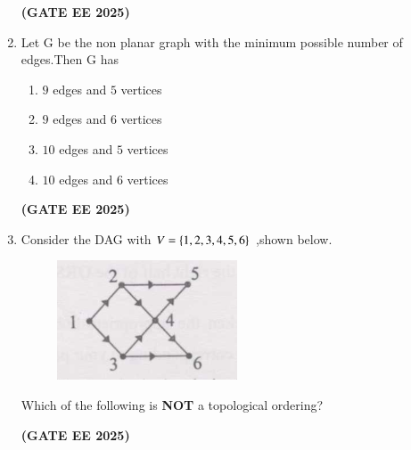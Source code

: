 \documentclass[journal,12pt,onecolumn]{IEEEtran}
\theoremstyle{remark}
\begin{document}
\begin{enumerate}
    \begin{enumerate}[label=(\Alph*)]
\end{enumerate}
\hfill \textbf{(GATE EE 2025)}


\item   Let G be the non planar graph with the minimum possible number of edges.Then G has

\begin{enumerate}

    \item $9$ edges and  $5$  vertices
    \item $9$ edges and  $6$  vertices
    \item $10$ edges and  $5$  vertices
    \item $10$ edges and  $6$  vertices

\end{enumerate}
\hfill \textbf{(GATE EE 2025)}

\item    Consider the DAG with $V=\left\{1,2,3,4,5,6\right\}$ ,shown below.
\newline


    

\begin{figure}[h]
    \centering
    \includegraphics[width=0.2\columnwidth]{figs/fig1.png}
	\caption{ } 
    \label{fig1}
    

\end{figure}
   Which of the following is \textbf{NOT} a topological ordering?
   
\begin{enumerate}
\end{enumerate}
\hfill \textbf{(GATE EE 2025)}



\end{enumerate}
\end{document}
